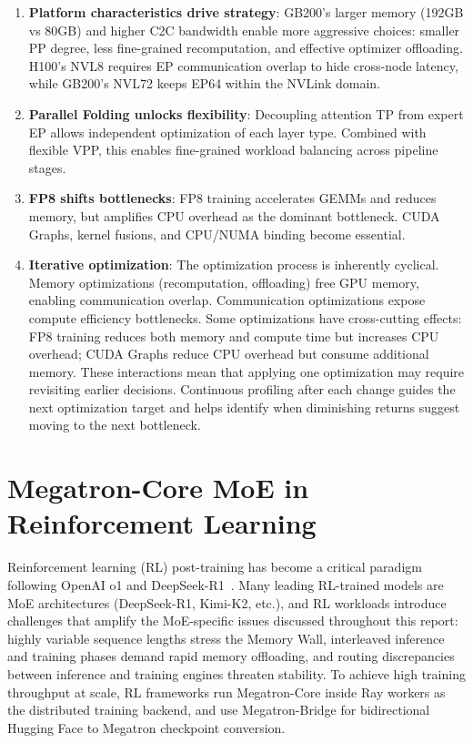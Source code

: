 \documentclass[10pt,logo,copyright]{nvidiatechreport}
\begin{document}
\begin{enumerate}
    \item \textbf{Platform characteristics drive strategy}: GB200's larger memory (192GB vs 80GB) and higher C2C bandwidth enable more aggressive choices: smaller PP degree, less fine-grained recomputation, and effective optimizer offloading. H100's NVL8 requires EP communication overlap to hide cross-node latency, while GB200's NVL72 keeps EP64 within the NVLink domain.
    \item \textbf{Parallel Folding unlocks flexibility}: Decoupling attention TP from expert EP allows independent optimization of each layer type. Combined with flexible VPP, this enables fine-grained workload balancing across pipeline stages.
    \item \textbf{FP8 shifts bottlenecks}: FP8 training accelerates GEMMs and reduces memory, but amplifies CPU overhead as the dominant bottleneck. CUDA Graphs, kernel fusions, and CPU/NUMA binding become essential.
    \item \textbf{Iterative optimization}: The optimization process is inherently cyclical. Memory optimizations (recomputation, offloading) free GPU memory, enabling communication overlap. Communication optimizations expose compute efficiency bottlenecks. Some optimizations have cross-cutting effects: FP8 training reduces both memory and compute time but increases CPU overhead; CUDA Graphs reduce CPU overhead but consume additional memory. These interactions mean that applying one optimization may require revisiting earlier decisions. Continuous profiling after each change guides the next optimization target and helps identify when diminishing returns suggest moving to the next bottleneck.
\end{enumerate}

\section{Megatron-Core MoE in Reinforcement Learning}\label{sec:rl}
Reinforcement learning (RL) post-training has become a critical paradigm following OpenAI o1 and DeepSeek-R1~\cite{deepseekai2025deepseekr1}. Many leading RL-trained models are MoE architectures (DeepSeek-R1, Kimi-K2, etc.), and RL workloads introduce challenges that amplify the MoE-specific issues discussed throughout this report: highly variable sequence lengths stress the Memory Wall, interleaved inference and training phases demand rapid memory offloading, and routing discrepancies between inference and training engines threaten stability. To achieve high training throughput at scale, RL frameworks run Megatron-Core inside Ray workers as the distributed training backend, and use Megatron-Bridge for bidirectional Hugging Face to Megatron checkpoint conversion.
\end{document}
